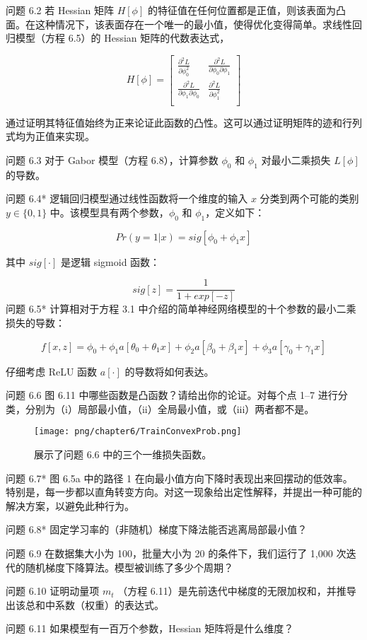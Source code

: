 问题 6.2 若 Hessian 矩阵 \(H[\phi]\) 的特征值在任何位置都是正值，则该表面为凸面。在这种情况下，该表面存在一个唯一的最小值，使得优化变得简单。求线性回归模型（方程 6.5）的 Hessian 矩阵的代数表达式，

\begin{equation}
H[\phi] = \begin{bmatrix}
\frac{\partial^2 L}{\partial \phi_0^2} & \frac{\partial^2 L}{\partial \phi_0 \partial \phi_1}  \\
\frac{\partial^2 L}{\partial \phi_1 \partial \phi_0} & \frac{\partial^2 L}{\partial \phi_1^2}  \\
\end{bmatrix} 
\end{equation}

通过证明其特征值始终为正来论证此函数的凸性。这可以通过证明矩阵的迹和行列式均为正值来实现。

问题 6.3 对于 Gabor 模型（方程 6.8），计算参数 \(\phi_0\) 和 \(\phi_1\) 对最小二乘损失 \(L[\phi]\) 的导数。

问题 6.4* 逻辑回归模型通过线性函数将一个维度的输入 \(x\) 分类到两个可能的类别 \(y \in \{0,1\}\) 中。该模型具有两个参数，\(\phi_0\) 和 \(\phi_1\)，定义如下：

\begin{equation}
Pr(y = 1|x) = sig[\phi_0 + \phi_1x] 
\end{equation}

其中 \(sig[\cdot]\) 是逻辑 sigmoid 函数：

\begin{equation}
sig[z] = \frac{1}{1 + exp[-z]} 
\end{equation}
问题 6.5* 计算相对于方程 3.1 中介绍的简单神经网络模型的十个参数的最小二乘损失的导数：

\begin{equation}
f[x,z] = \phi_0 + \phi_1a[\theta_0 + \theta_1x] + \phi_2a[\beta_0 + \beta_1x] + \phi_3a[\gamma_0 + \gamma_1x] 
\end{equation}

仔细考虑 ReLU 函数 \(a[\cdot]\) 的导数将如何表达。

问题 6.6 图 6.11 中哪些函数是凸函数？请给出你的论证。对每个点 1–7 进行分类，分别为（i）局部最小值，（ii）全局最小值，或（iii）两者都不是。

\begin{figure}[ht!]
\centering
\texttt{[image: png/chapter6/TrainConvexProb.png]}
\caption{展示了问题 6.6 中的三个一维损失函数。}
\end{figure}


问题 6.7* 图 6.5a 中的路径 1 在向最小值方向下降时表现出来回摆动的低效率。特别是，每一步都以直角转变方向。对这一现象给出定性解释，并提出一种可能的解决方案，以避免此种行为。

问题 6.8* 固定学习率的（非随机）梯度下降法能否逃离局部最小值？

问题 6.9 在数据集大小为 100，批量大小为 20 的条件下，我们运行了 1,000 次迭代的随机梯度下降算法。模型被训练了多少个周期？

问题 6.10 证明动量项 \(m_t\) （方程 6.11）是先前迭代中梯度的无限加权和，并推导出该总和中系数（权重）的表达式。

问题 6.11 如果模型有一百万个参数，Hessian 矩阵将是什么维度？
